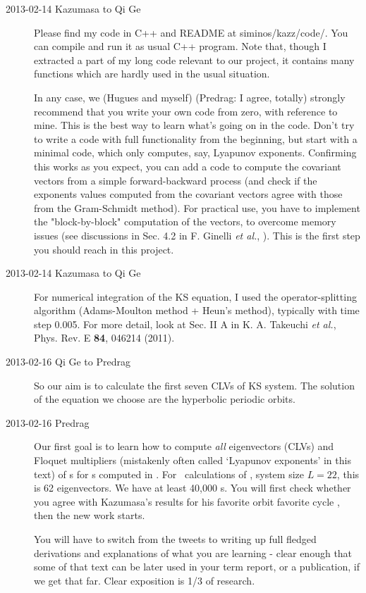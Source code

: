 \begin{description}
\item[2013-02-14 Kazumasa to Qi Ge]
Please find my code in C++ and README at siminos/kazz/code/.
You can compile and run it as usual C++ program.
Note that, though I extracted a part of my long code relevant to our project,
 it contains many functions which are hardly used in the usual situation.

In any case, we (Hugues and myself) (Predrag: I agree, totally)
strongly recommend that you write your own code from zero, with
reference to mine. This is the best way to learn what's going on in
the code. Don't try to write a code with full functionality from the
beginning, but start with a minimal code, which only computes, say,
Lyapunov exponents.
Confirming this works as you expect, you can add a code to compute
the covariant vectors from a simple forward-backward process (and
check if the exponents values computed from the covariant vectors
agree with those from the Gram-Schmidt method). For practical use,
you have to implement the "block-by-block" computation of the
vectors, to overcome memory issues (see discussions in Sec. 4.2 in F.
Ginelli \textit{et al.}, ). This is
the first step you should reach in this project.

\item[2013-02-14 Kazumasa to Qi Ge]
For numerical integration of the KS equation, I used the
operator-splitting algorithm (Adams-Moulton method + Heun's method),
typically with time step 0.005.
For more detail, look at Sec. II A in K. A. Takeuchi \textit{et al.},
 Phys. Rev. E \textbf{84}, 046214 (2011).

\item[2013-02-16 Qi Ge to Predrag] So our aim is to calculate the
first seven CLVs of KS system. The solution of the equation we choose
are the hyperbolic periodic orbits.

\item[2013-02-16 Predrag] Our first goal is to learn
how to compute \emph{all} eigenvectors (CLVs) and Floquet multipliers
(mistakenly often called `Lyapunov exponents' in this text) of
\JacobianM s for \po s computed in . For \KS\
calculations of , system size $L=22$, this is 62
eigenvectors. We have at least 40,000 \rpo s. You will first check
whether you agree with Kazumasa's results for his favorite orbit
favorite cycle \PO{10.25}, then the new work starts.

You will have to switch from the tweets to writing up full fledged
derivations and explanations of what you are learning - clear enough
that some of that text can be later used in your term report, or a
publication, if we get that far. Clear exposition is 1/3 of research.


\end{description}
